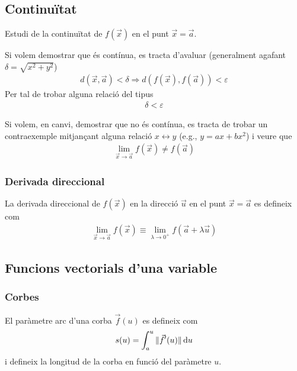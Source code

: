 \section{\mytitle}

\subsection*{Continuïtat}
Estudi de la continuïtat de $f(\vec{x})$ en el punt $\vec{x} = \vec{a}$. 

Si volem demostrar que és contínua, es tracta d'avaluar (generalment agafant $\delta = \sqrt{x^{2} + y^{2}}$)
\begin{align}
    d(\vec{x}, \vec{a}) < \delta \Rightarrow d(f(\vec{x}), f(\vec{a})) < \varepsilon
\end{align}
Per tal de trobar alguna relació del tipus 
\begin{align}
    \delta < \varepsilon
\end{align}

Si volem, en canvi, demostrar que no és contínua, es tracta de trobar un contraexemple mitjançant alguna relació $x \leftrightarrow y$ (e.g., $y = ax + bx^{2}$) i veure que 
\begin{align}
    \lim_{\vec{x} \to \vec{a}} f(\vec{x}) \neq f(\vec{a})
\end{align}

\subsubsection*{Derivada direccional}
La derivada direccional de $f(\vec{x})$ en la direcció $\vec{u}$ en el punt $\vec{x} = \vec{a}$ es defineix com
\begin{align}
    \lim_{\vec{x} \to \vec{a}} f(\vec{x}) \equiv \lim_{\lambda \to 0^{+}} f(\vec{a} + \lambda \vec{u})
\end{align}

\subsection*{Funcions vectorials d'una variable}
\subsubsection*{Corbes}
El paràmetre arc d'una corba $\vec{f}(u)$ es defineix com
\begin{align}
    s(u) = \int_{a}^{u} \| \vec{f}'(u) \| \mathop{}\!\mathrm{d} u
\end{align}
i defineix la longitud de la corba en funció del paràmetre $u$.

